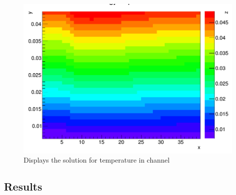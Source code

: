 \documentclass[paper=a4, fontsize=11pt, abstract=on]{scrartcl}
\numberwithin{equation}{section}		%
\numberwithin{figure}{section}			%
\numberwithin{table}{section}				%
\begin{document}
\begin{figure}[H]
\centering
\includegraphics[width=0.75\linewidth]{chan3}
\caption{Displays the solution for temperature in channel}
\label{chan3}
\end{figure}

\subsection{Results}
\end{document}
